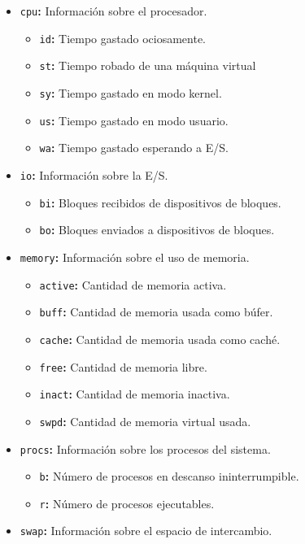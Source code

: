 \begin{itemize}
	\item\texttt{cpu}\textbf{:} Información sobre el procesador.
	\begin{itemize}
		\item\texttt{id}\textbf{:} Tiempo gastado ociosamente.
		\item\texttt{st}\textbf{:} Tiempo robado de una máquina virtual
		\item\texttt{sy}\textbf{:} Tiempo gastado en modo kernel.
		\item\texttt{us}\textbf{:} Tiempo gastado en modo usuario.
		\item\texttt{wa}\textbf{:} Tiempo gastado esperando a E/S.
	\end{itemize}
	\item\texttt{io}\textbf{:} Información sobre la E/S.
	\begin{itemize}
		\item\texttt{bi}\textbf{:} Bloques recibidos de dispositivos de bloques.
		\item\texttt{bo}\textbf{:} Bloques enviados a dispositivos de bloques.
	\end{itemize}
	\item\texttt{memory}\textbf{:} Información sobre el uso de memoria.
	\begin{itemize}
		\item\texttt{active}\textbf{:} Cantidad de memoria activa.
		\item\texttt{buff}\textbf{:} Cantidad de memoria usada como búfer.
		\item\texttt{cache}\textbf{:} Cantidad de memoria usada como caché.
		\item\texttt{free}\textbf{:} Cantidad de memoria libre.
		\item\texttt{inact}\textbf{:} Cantidad de memoria inactiva.
		\item\texttt{swpd}\textbf{:} Cantidad de memoria virtual usada.
	\end{itemize}
	\item\texttt{procs}\textbf{:} Información sobre los procesos del sistema.
	\begin{itemize}
		\item\texttt{b}\textbf{:} Número de procesos en descanso ininterrumpible.
		\item\texttt{r}\textbf{:} Número de procesos ejecutables.
	\end{itemize}
	\item\texttt{swap}\textbf{:} Información sobre el espacio de intercambio.

\end{itemize}
